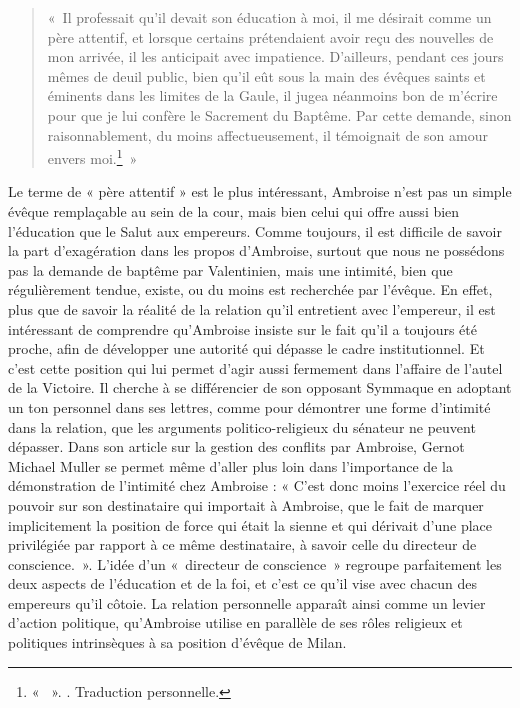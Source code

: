 \bigskip

\begin{quote} «~Il professait qu'il devait son éducation à moi, il me désirait comme un père attentif, et lorsque certains prétendaient avoir reçu des nouvelles de mon arrivée, il les anticipait avec impatience. D'ailleurs, pendant ces jours mêmes de deuil public, bien qu'il eût sous la main des évêques saints et éminents dans les limites de la Gaule, il jugea néanmoins bon de m'écrire pour que je lui confère le Sacrement du Baptême. Par cette demande, sinon raisonnablement, du moins affectueusement, il témoignait de son amour envers moi.\footnote{« ~». \cite[, 2.]{ambroise_csel_82_1}. Traduction personnelle.}~» \end{quote}

\bigskip

Le terme de « père attentif » est le plus intéressant, Ambroise n'est pas un simple évêque remplaçable au sein de la cour, mais bien celui qui offre aussi bien l'éducation que le Salut aux empereurs. Comme toujours, il est difficile de savoir la part d'exagération dans les propos d'Ambroise, surtout que nous ne possédons pas la demande de baptême par Valentinien, mais une intimité, bien que régulièrement tendue, existe, ou du moins est recherchée par l'évêque. En effet, plus que de savoir la réalité de la relation qu'il entretient avec l'empereur, il est intéressant de comprendre qu'Ambroise insiste sur le fait qu'il a toujours été proche, afin de développer une autorité qui dépasse le cadre institutionnel. Et c'est cette position qui lui permet d'agir aussi fermement dans l'affaire de l'autel de la Victoire. Il cherche à se différencier de son opposant Symmaque en adoptant un ton personnel dans ses lettres, comme pour démontrer une forme d'intimité dans la relation, que les arguments politico-religieux du sénateur ne peuvent dépasser. Dans son article sur la gestion des conflits par Ambroise, Gernot Michael Muller se permet même d'aller plus loin dans l'importance de la démonstration de l'intimité chez Ambroise : « C’est donc moins l’exercice réel du pouvoir sur son destinataire qui importait à Ambroise, que le fait de marquer implicitement la position de force qui était la sienne et qui dérivait d’une place privilégiée par rapport à ce même destinataire, à savoir celle du directeur de conscience.\autocite{muller_conflits}~». L'idée d'un «~directeur de conscience~» regroupe parfaitement les deux aspects de l'éducation et de la foi, et c'est ce qu'il vise avec chacun des empereurs qu'il côtoie. La relation personnelle apparaît ainsi comme un levier d'action politique, qu'Ambroise utilise en parallèle de ses rôles religieux et politiques intrinsèques à sa position d'évêque de Milan.

